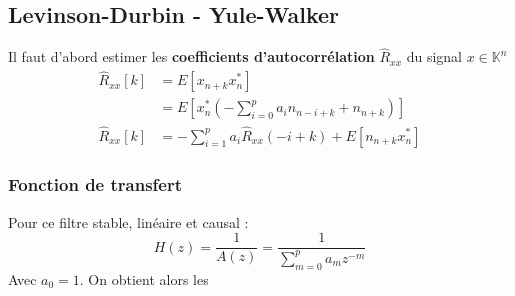 \subsection{Levinson-Durbin - Yule-Walker}
Il faut d'abord estimer les \textbf{coefficients d'autocorrélation} $\widehat{R}_{xx}$ du signal $x \in \mathbb{K}^{n}$ 
\Large
\begin{align}
    \widehat{R}_{xx}[k] &= E[x_{n+k}x^{*}_{n}] \nonumber\\
                        &= E[x^{*}_{n}(-\sum_{i=0}^{p}{a_{i}n_{n-i+k} + n_{n+k}})] \nonumber \\
    \widehat{R}_{xx}[k] &=-\sum_{i=1}^{p}{a_{i}\widehat{R}_{xx}(-i+k) + E[n_{n+k}x^{*}_{n}]} \nonumber
\end{align}
\normalsize
\subsubsection{Fonction de transfert}
Pour ce filtre stable, linéaire et causal : 
\begin{equation}
    H(z) = \frac{1}{A(z)} = \frac{1}{\sum_{m=0}^{p}{a_{m}z^{-m}}}
\end{equation}
Avec $a_{0} = 1$. On obtient alors les 
